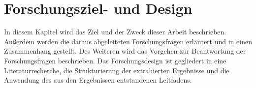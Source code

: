 \chapter{Forschungsziel- und Design}

In diesem Kapitel wird das Ziel und der Zweck dieser Arbeit beschrieben. Außerdem werden die daraus abgeleiteten Forschungsfragen erläutert und in einen Zusammenhang gestellt. Des Weiteren wird das Vorgehen zur Beantwortung der Forschungsfragen beschrieben. Das Forschungsdesign ist gegliedert in eine Literaturrecherche, die Strukturierung der extrahierten Ergebnisse und die Anwendung des aus den Ergebnissen entstandenen Leitfadens.






